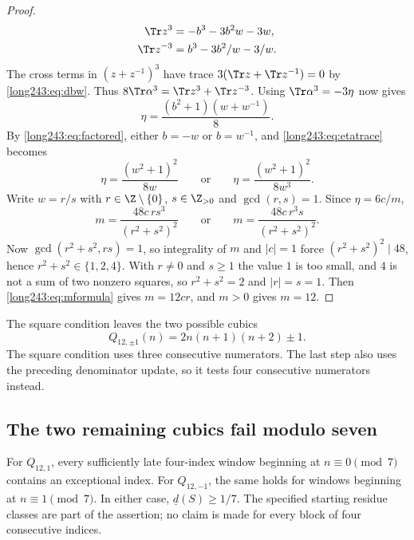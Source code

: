 \begin{proof}
\[
 \begin{aligned}
 \Tr z^3&=-b^3-3b^2w-3w,\\
 \Tr z^{-3}&=b^3-3b^2/w-3/w.
 \end{aligned}
\]
The cross terms in $(z+z^{-1})^3$ have trace
$3(\Tr z+\Tr z^{-1})=0$ by \eqref{long243:eq:dbw}.
Thus $8\Tr\alpha^3=\Tr z^3+\Tr z^{-3}$.
Using $\Tr\alpha^3=-3\eta$ now gives
\begin{equation}\label{long243:eq:etatrace}
 \eta=\frac{(b^2+1)(w+w^{-1})}8 .
\end{equation}
By \eqref{long243:eq:factored}, either $b=-w$ or $b=w^{-1}$, and \eqref{long243:eq:etatrace}
becomes
\[
 \eta=\frac{(w^2+1)^2}{8w}
 \qquad\text{or}\qquad
 \eta=\frac{(w^2+1)^2}{8w^3}.
\]
Write $w=r/s$ with $r\in\Z\mathbin{\backslash}\{0\}$, $s\in\Z_{>0}$ and $\gcd(r,s)=1$.
Since $\eta=6c/m$,
\begin{equation}\label{long243:eq:mformula}
 m=\frac{48c\,rs^3}{(r^2+s^2)^2}
 \qquad\text{or}\qquad
 m=\frac{48c\,r^3s}{(r^2+s^2)^2}.
\end{equation}
Now $\gcd(r^2+s^2,rs)=1$, so integrality of $m$ and $|c|=1$ force
$(r^2+s^2)^2\mid48$, hence $r^2+s^2\in\{1,2,4\}$.  With $r\ne0$ and $s\ge1$ the
value $1$ is too small, and $4$ is not a sum of two nonzero squares, so
$r^2+s^2=2$ and $|r|=s=1$.  Then \eqref{long243:eq:mformula} gives $m=12cr$, and
$m>0$ gives $m=12$.
\end{proof}

The square condition leaves the two possible cubics
\begin{equation}\label{long243:eq:survivors}
 Q_{12,\pm1}(n)=2n(n+1)(n+2)\pm1 .
\end{equation}
The square condition uses three consecutive numerators. The last step
also uses the preceding denominator update, so it tests four consecutive
numerators instead.

\subsection{The two remaining cubics fail modulo seven}\label{long243:sec:modseven}

\begin{lemma}\label{long243:res:modseven}
For $Q_{12,1}$, every sufficiently late four-index window beginning at
$n\equiv0\pmod7$ contains an exceptional index. For $Q_{12,-1}$, the same
holds for windows beginning at $n\equiv1\pmod7$. In either case,
$\underline d(S)\ge1/7$.
The specified starting residue classes are part of the assertion; no
claim is made for every block of four consecutive indices.
\end{lemma}

